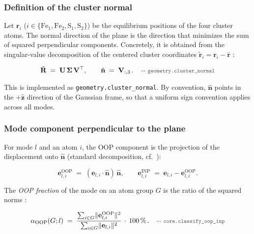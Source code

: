 \documentclass[11pt,a4paper,twoside]{article}
\newcommand{\evec}{\mathbf{e}}
\newcommand{\rvec}{\mathbf{r}}
\newcommand{\nhat}{\hat{\mathbf{n}}}
\newcommand{\zhat}{\hat{\mathbf{z}}}
\newcommand{\Fei}{\mathrm{Fe}}
\newcommand{\OOP}{\mathrm{OOP}}
\newcommand{\INP}{\mathrm{INP}}
\newcommand{\codref}[1]{%
  \quad\text{\textcolor{gray!70!black}{\footnotesize $\rightsquigarrow$~\texttt{#1}}}}
\theoremstyle{remark}
\begin{document}
\subsubsection*{Definition of the cluster normal}

Let $\rvec_i$ ($i \in \{\Fei_1, \Fei_2, \mathrm{S}_1, \mathrm{S}_2\}$)
be the equilibrium positions of the four cluster atoms. The normal
direction of the plane is the direction that minimizes the sum of
squared perpendicular components. Concretely, it is obtained from
the singular-value decomposition of the centered cluster coordinates
$\tilde{\rvec}_i = \rvec_i - \bar{\rvec}$ \cite{Kabsch1976}:

\begin{equation}
  \tilde{\mathbf{R}} \;=\; \mathbf{U}\,\boldsymbol{\Sigma}\,\mathbf{V}^\top ,
  \qquad
  \nhat \;=\; \mathbf{V}_{:,3}\,.
  \codref{geometry.cluster\_normal}
  \label{eq:cluster-normal-svd}
\end{equation}

This is implemented as \texttt{geometry.cluster\_normal}.
By convention, $\nhat$ points in the $+\zhat$ direction of the
Gaussian frame, so that a uniform sign convention applies across
all modes.

\subsubsection*{Mode component perpendicular to the plane}

For mode $l$ and an atom $i$, the OOP component is the projection
of the displacement onto $\nhat$ (standard decomposition, cf.\
\cite{Gee2021}):

\begin{equation}
  \evec_{l,i}^{\OOP} \;=\; (\evec_{l,i} \cdot \nhat)\, \nhat ,
  \qquad
  \evec_{l,i}^{\INP} \;=\; \evec_{l,i} - \evec_{l,i}^{\OOP} .
  \label{eq:oop-projektion}
\end{equation}

The \emph{OOP fraction} of the mode on an atom group $G$ is the
ratio of the squared norms \cite{Gee2021}:

\begin{equation}
  \alpha_{\OOP}(G; l) \;=\;
  \frac{\sum_{i \in G} \lVert\evec_{l,i}^{\OOP}\rVert^2}
       {\sum_{i \in G} \lVert\evec_{l,i}\rVert^2} \,\cdot\, 100\,\%
  \,.
  \codref{core.classify\_oop\_inp}
  \label{eq:oop-anteil}
\end{equation}
\end{document}
